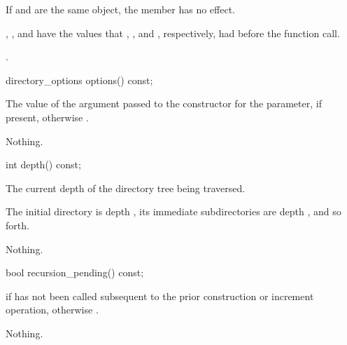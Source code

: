\begin{itemdescr}
\pnum
\effects
If  and  are the same
object, the member has no effect.

\pnum
\ensures
{}, ,
and  have the values that ,
, and , respectively, had before the function call.

\pnum
\returns
{}.
\end{itemdescr}

%
\begin{itemdecl}
directory_options options() const;
\end{itemdecl}

\begin{itemdescr}
\pnum
\returns
The value of the argument passed to the constructor for the
 parameter, if present, otherwise
.

\pnum
\throws
Nothing.
\end{itemdescr}

%
\begin{itemdecl}
int depth() const;
\end{itemdecl}

\begin{itemdescr}
\pnum
\returns
The current depth of the directory tree being traversed.
\begin{note}
  The initial directory is depth , its immediate subdirectories are depth ,
  and so forth.
\end{note}

\pnum
\throws
Nothing.
\end{itemdescr}

%
\begin{itemdecl}
bool recursion_pending() const;
\end{itemdecl}

\begin{itemdescr}
\pnum
\returns
{} if 
  has not been called subsequent to the prior construction or increment
  operation, otherwise .

\pnum
\throws
Nothing.
\end{itemdescr}

